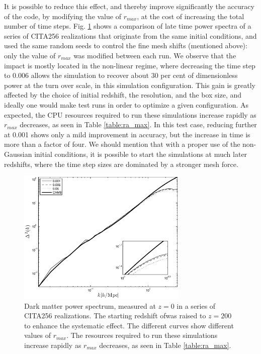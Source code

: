 It is possible to reduce this effect, and thereby improve significantly 
the accuracy of the code, by modifying the value of $r_{max}$, at the cost of increasing the total number of time steps.
Fig. \ref{fig:ra_max} shows a comparison of late time power spectra of a series of CITA256 realizations that originate from the same initial conditions, 
and used the same random seeds to control the fine mesh shifts (mentioned above): only the value of $r_{max}$ was modified between each run. 
We observe that the impact is mostly located in the non-linear regime, where decreasing the time step to 0.006 
allows the simulation to recover about 30 per cent of dimensionless power at the turn over scale, in this simulation configuration.
This gain is greatly affected by the choice of initial redshift, the resolution, and the box size, and ideally one would make
test runs in order to optimize a given configuration.  
As expected, the {\small CPU} resources required to run these simulations increase rapidly as $r_{max}$ decreases, as seen in Table \ref{table:ra_max}. 
In this test case, reducing further at 0.001 shows only a mild improvement in accuracy, but the increase in time is more than a factor of four.
We should mention that with a proper use of the non-Gaussian initial conditions, it is possible to start the simulations at much later redshifts, where the time step sizes are dominated by a stronger mesh force.
 

\begin{figure}%
  \begin{center}
    \includegraphics[width=3.2in]{graphs/power_ra_max.eps}
  \caption{Dark matter power spectrum, measured at $z=0$ in a series of CITA256 realizations. 
 The starting redshift ofwas raised to $z=200$ to enhance the systematic effect. The different curves show different values of $r_{max}$. 
  The resources required to run these simulations increase rapidly as $r_{max}$ decreases, as seen in Table \ref{table:ra_max}.    \label{fig:ra_max}}
\end{center}
\end{figure}

